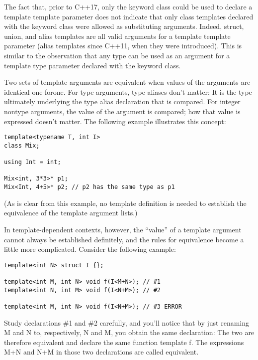 The fact that, prior to C++17, only the keyword class could be used to declare a template template parameter does not indicate that only class templates declared with the keyword class were allowed as substituting arguments. Indeed, struct, union, and alias templates are all valid arguments for a template template parameter (alias templates since C++11, when they were introduced). This is similar to the observation that any type can be used as an argument for a template type parameter declared with the keyword class.


Two sets of template arguments are equivalent when values of the arguments are identical one-forone. For type arguments, type aliases don’t matter: It is the type ultimately underlying the type alias declaration that is compared. For integer nontype arguments, the value of the argument is compared; how that value is expressed doesn’t matter. The following example illustrates this concept:

\begin{lstlisting}[style=styleCXX]
template<typename T, int I>
class Mix;

using Int = int;

Mix<int, 3*3>* p1;
Mix<Int, 4+5>* p2; // p2 has the same type as p1
\end{lstlisting}

(As is clear from this example, no template definition is needed to establish the equivalence of the template argument lists.)

In template-dependent contexts, however, the “value” of a template argument cannot always be established definitely, and the rules for equivalence become a little more complicated. Consider the following example:

\begin{lstlisting}[style=styleCXX]
template<int N> struct I {};

template<int M, int N> void f(I<M+N>); // #1
template<int N, int M> void f(I<N+M>); // #2

template<int M, int N> void f(I<N+M>); // #3 ERROR
\end{lstlisting}

Study declarations \#1 and \#2 carefully, and you’ll notice that by just renaming M and N to, respectively, N and M, you obtain the same declaration: The two are therefore equivalent and declare the same function template f. The expressions M+N and N+M in those two declarations are called equivalent.

